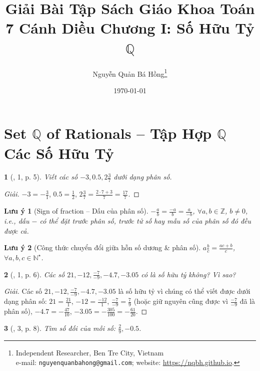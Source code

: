 \documentclass{article}
\title{Giải Bài Tập Sách Giáo Khoa Toán 7 Cánh Diều Chương I: Số Hữu Tỷ $\mathbb{Q}$}
\author{Nguyễn Quản Bá Hồng\footnote{Independent Researcher, Ben Tre City, Vietnam\\e-mail: \texttt{nguyenquanbahong@gmail.com}; website: \url{https://nqbh.github.io}.}}
\date{\today}
\newtheorem{baitoan}{}
\newtheorem{luuy}{Lưu ý}
\begin{document}
\maketitle


\section{Set $\mathbb{Q}$ of Rationals -- Tập Hợp $\mathbb{Q}$ Các Số Hữu Tỷ}

\begin{baitoan}[\cite{SGK_Toan_7_Canh_Dieu_tap_1}, 1, p. 5]
	Viết các số $-3,0.5,2\frac{3}{7}$ dưới dạng phân số.
\end{baitoan}

\begin{proof}[Giải]
	$-3 = -\frac{3}{1}$, $0.5 = \frac{1}{2}$, $2\frac{3}{7} = \frac{2\cdot7 + 3}{7} = \frac{17}{7}$.
\end{proof}

\begin{luuy}[Sign of fraction -- Dấu của phân số]
	$-\frac{a}{b} = \frac{-a}{b} = \frac{a}{-b}$, $\forall a,b\in\mathbb{Z}$, $b\ne0$, i.e., dấu $-$ có thể đặt trước phân số, trước tử số hay mẫu số của phân số đó đều được cả.
\end{luuy}

\begin{luuy}[Công thức chuyển đổi giữa hỗn số dương \& phân số]
	$a\frac{b}{c} = \frac{ac + b}{c}$, $\forall a,b,c\in\mathbb{N}^\star$.
\end{luuy}

\begin{baitoan}[\cite{SGK_Toan_7_Canh_Dieu_tap_1}, 1, p. 6]
	Các số $21,-12,\frac{-7}{-9},-4.7,-3.05$ có là số hữu tỷ không? Vì sao?
\end{baitoan}

\begin{proof}[Giải]
	Các số $21,-12,\frac{-7}{-9},-4.7,-3.05$ là số hữu tỷ vì chúng có thể viết được dưới dạng phân số: $21 = \frac{21}{1}$, $-12 = \frac{-12}{1}$, $\frac{-7}{-9} = \frac{7}{9}$ (hoặc giữ nguyên cũng được vì $\frac{-7}{-9}$ đã là phân số), $-4.7 = -\frac{47}{10}$, $-3.05 = -\frac{305}{100} = -\frac{61}{20}$.
\end{proof}

\begin{baitoan}[\cite{SGK_Toan_7_Canh_Dieu_tap_1}, 3, p. 8]
	Tìm số đối của mỗi số: $\frac{2}{9},-0.5$.
\end{baitoan}
\end{document}
